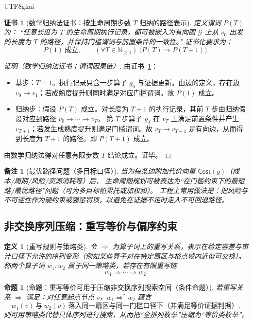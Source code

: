 \documentclass[12pt]{article}
\newtheorem{definition}{定义}[section]
\newtheorem{proposition}{命题}[section]
\newtheorem{remark}{备注}[section]
\newtheorem{Certificate}{证书}[section]
\newcommand{\NN}{\mathbb{N}}
\begin{document}
\begin{CJK*}{UTF8}{gkai}
\begin{Certificate}[数学归纳法证书：按生命周期步数 $T$ 归纳的路径表示]
\label{cert:lifecycle-is-a-directed-path}
定义谓词 $P(T)$ 为：
“任意长度为 $T$ 的生命周期执行记录，都可被嵌入为有向图 $\mathcal{G}$ 上从 $v_0$ 出发的长度为 $T$ 的路径，并保持门槛谓词与前置条件的一致性。”
证书化要求为：
\[
  P(1)\ \text{成立},\qquad
  (\forall T\in\NN_{\ge 1})\ \bigl(P(T)\Rightarrow P(T+1)\bigr).
\]
\end{Certificate}

\begin{proof}[证明（数学归纳法证书；谓词因果链）]
由证书~\ref{cert:lifecycle-is-a-directed-path}：
\begin{itemize}
  \item 基步：$T=1$。执行记录只含一步算子 $g_0$ 与证据更新。由边的定义，存在边 $v_0\to v_1$；若成熟度提升则同时满足对应门槛谓词。故 $P(1)$ 成立。
  \item 归纳步：假设 $P(T)$ 成立。对长度为 $T+1$ 的执行记录，其前 $T$ 步由归纳假设对应到路径 $v_0\to\cdots\to v_T$。
  第 $T$ 步算子 $g_T$ 在 $v_T$ 上满足前置条件并产生 $v_{T+1}$；若发生成熟度提升则满足门槛谓词。故 $v_T\to v_{T+1}$ 是有向边，从而得到长度为 $T+1$ 的路径。即 $P(T+1)$ 成立。
\end{itemize}
由数学归纳法得对任意有限步数 $T$ 结论成立。证毕。
\end{proof}

\begin{remark}[最优路径问题（多目标口径）]
当为每条边附加代价向量 $\mathsf{Cost}(g)$（成本/周期/风险/资源消耗等）后，
生命周期规划可被表达为“在门槛约束下的最短路/最优路径”问题（可为多目标帕累托或加权和）。
工程上常用做法是：把风险与不可逆性作为硬约束或强惩罚项，以避免在证据不足时走入不可回退路径。
\end{remark}

\subsection{非交换序列压缩：重写等价与偏序约束}
\label{sec:lifecycle-rewriting-and-partial-order}

\begin{definition}[重写规则与策略类]
令 $\Rightarrow$ 为算子词上的重写关系，表示在给定容差与审计口径下允许的序列变形（例如某些算子对在特定扇区与格点域内近似可交换）。
称两个算子词 $w_1,w_2$ 属于同一策略类，若存在有限重写链
\[
  w_1 \Rightarrow \cdots \Rightarrow w_2.
\]
\end{definition}

\begin{proposition}[命题：重写等价可用于压缩非交换序列搜索空间（条件命题）]
\label{prop:rewriting-reduces-search-space}
若重写关系 $\Rightarrow$ 满足：对任意起点节点 $v$，$w_1\Rightarrow^\ast w_2$ 蕴含
\[
  w_1(v)\ \text{与}\ w_2(v)\ \text{落入同一扇区与同一门槛口径下（并满足等价证据判据）},
\]
则可用策略类代替具体序列进行搜索，从而把“全排列枚举”压缩为“等价类枚举”。
\end{proposition}


\end{CJK*}
\end{document}
